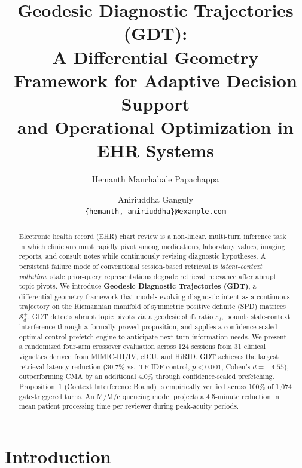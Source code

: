 \documentclass[11pt,a4paper]{article}
\begin{document}
\title{Geodesic Diagnostic Trajectories (GDT):\\
A Differential Geometry Framework for Adaptive Decision Support\\
and Operational Optimization in EHR Systems}

\author{
  Hemanth Manchabale Papachappa \and Aniriuddha Ganguly \\
  \texttt{\{hemanth, aniriuddha\}@example.com}
}

\maketitle

\begin{abstract}
Electronic health record (EHR) chart review is a non-linear, multi-turn inference task in which clinicians must rapidly pivot among medications, laboratory values, imaging reports, and consult notes while continuously revising diagnostic hypotheses. A persistent failure mode of conventional session-based retrieval is \emph{latent-context pollution}: stale prior-query representations degrade retrieval relevance after abrupt topic pivots. We introduce \textbf{Geodesic Diagnostic Trajectories (GDT)}, a differential-geometry framework that models evolving diagnostic intent as a continuous trajectory on the Riemannian manifold of symmetric positive definite (SPD) matrices $\mathcal{S}_d^+$. GDT detects abrupt topic pivots via a geodesic shift ratio $\kappa_t$, bounds stale-context interference through a formally proved proposition, and applies a confidence-scaled optimal-control prefetch engine to anticipate next-turn information needs. We present a randomized four-arm crossover evaluation across 124 sessions from 31 clinical vignettes derived from MIMIC-III/IV, eICU, and HiRID. GDT achieves the largest retrieval latency reduction (30.7\% vs.\ TF-IDF control, $p{<}0.001$, Cohen's $d{=}{-4.55}$), outperforming CMA by an additional 4.0\% through confidence-scaled prefetching. Proposition~1 (Context Interference Bound) is empirically verified across 100\% of 1,074 gate-triggered turns. An M/M/c queueing model projects a 4.5-minute reduction in mean patient processing time per reviewer during peak-acuity periods.
\end{abstract}



\section{Introduction}
\label{sec:intro}
\end{document}
